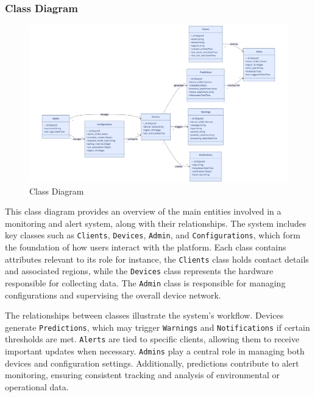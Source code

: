 \subsubsection{Class Diagram}
\begin{figure}[H]
    \centering
    \includegraphics[width=1\linewidth]{Figures/ClasseDia.png}
    \caption{Class Diagram}
    \label{fig:enter-label}
\end{figure}
This class diagram provides an overview of the main entities involved in a monitoring and alert system, along with their relationships. The system includes key classes such as 
 \texttt{Clients}, \texttt{Devices}, \texttt{Admin}, and \texttt{Configurations}, which form the foundation of how users interact with the platform. Each class contains attributes relevant to its role for instance, the \texttt{Clients} class holds contact details and associated regions, while the \texttt{Devices} class represents the hardware responsible for collecting data. The \texttt{Admin} class is responsible for managing configurations and supervising the overall device network.

The relationships between classes illustrate the system's workflow. Devices generate \texttt{Predictions}, which may trigger \texttt{Warnings} and \texttt{Notifications} if certain thresholds are met. \texttt{Alerts} are tied to specific clients, allowing them to receive important updates when necessary. \texttt{Admins} play a central role in managing both devices and configuration settings. Additionally, predictions contribute to alert monitoring, ensuring consistent tracking and analysis of environmental or operational data.
